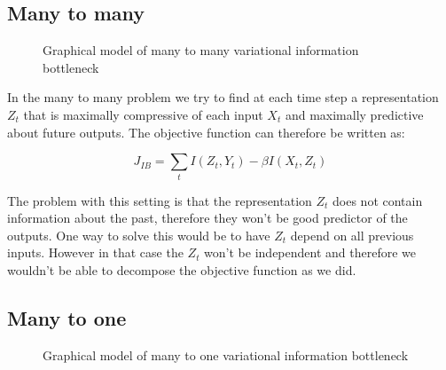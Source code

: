 \documentclass[10pt,oneside,openright]{report}
\begin{document}
\subsection{Many to many}
\begin{figure}[H]
\centering
{}
\caption{Graphical model of many to many variational information bottleneck}
\end{figure}

In the many to many problem we try to find at each time step a representation $Z_t$ that is maximally compressive of each input $X_t$ and maximally predictive about future outputs. The objective function can therefore be written as:

$$ J_{IB} = \sum_t I(Z_t, Y_{t}) - \beta I(X_{t}, Z_t)$$
 
 The problem with this setting is that the representation $Z_t$ does not contain information about the past, therefore they won't be good predictor of the outputs. One way to solve this would be to have $Z_t$ depend on all previous inputs. However in that case the $Z_t$ won't be independent and therefore we wouldn't be able to decompose the objective function as we did.
 
\subsection{Many to one}

\begin{figure}[H]
\centering
{}
\caption{Graphical model of many to one variational information bottleneck}
\end{figure}
\end{document}

